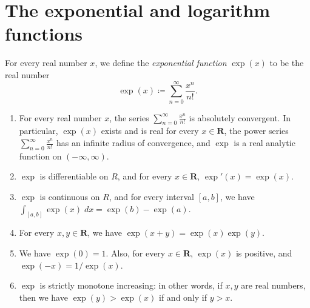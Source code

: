\section{The exponential and logarithm functions}\label{sec 4.5}

\begin{definition}\label{4.5.1}
    For every real number \(x\), we define the \emph{exponential function} \(\exp(x)\) to be the real number
    \[
        \exp(x) \coloneqq \sum_{n = 0}^\infty \frac{x^n}{n!}.
    \]
\end{definition}

\begin{theorem}\label{4.5.2}
    \quad
    \begin{enumerate}
        \item For every real number \(x\), the series \(\sum_{n = 0}^\infty \frac{x^n}{n!}\) is absolutely convergent.
              In particular, \(\exp(x)\) exists and is real for every \(x \in \mathbf{R}\), the power series \(\sum_{n = 0}^\infty \frac{x^n}{n!}\) has an infinite radius of convergence, and \(\exp\) is a real analytic function on \((-\infty, \infty)\).
        \item \(\exp\) is differentiable on \(R\), and for every \(x \in \mathbf{R}\), \(\exp'(x) = \exp(x)\).
        \item \(\exp\) is continuous on \(R\), and for every interval \([a, b]\), we have \(\int_{[a, b]} \exp(x) \; dx = \exp(b) - \exp(a)\).
        \item For every \(x, y \in \mathbf{R}\), we have \(\exp(x + y) = \exp(x) \exp(y)\).
        \item We have \(\exp(0) = 1\).
              Also, for every \(x \in \mathbf{R}\), \(\exp(x)\) is positive, and \(\exp(-x) = 1 / \exp(x)\).
        \item \(\exp\) is strictly monotone increasing:
              in other words, if \(x, y\) are real numbers, then we have \(\exp(y) > \exp(x)\) if and only if \(y > x\).
    \end{enumerate}
\end{theorem}

